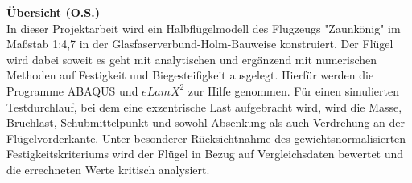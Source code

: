 \noindent\large{\textbf{Übersicht (O.S.)}}~\\

\noindent In dieser Projektarbeit wird ein Halbflügelmodell des Flugzeugs "Zaunkönig" im Maßstab 1:4,7 in der Glasfaserverbund-Holm-Bauweise konstruiert. Der Flügel wird dabei soweit es geht mit analytischen und ergänzend mit numerischen Methoden auf Festigkeit und Biegesteifigkeit ausgelegt. Hierfür werden die Programme ABAQUS und $ eLamX^{2} $ zur Hilfe genommen. Für einen simulierten Testdurchlauf, bei dem eine exzentrische Last aufgebracht wird, wird die Masse, Bruchlast, Schubmittelpunkt und sowohl Absenkung als auch Verdrehung an der Flügelvorderkante. Unter besonderer Rücksichtnahme des gewichtsnormalisierten Festigkeitskriteriums wird der Flügel in Bezug auf Vergleichsdaten bewertet und die errechneten Werte kritisch analysiert.